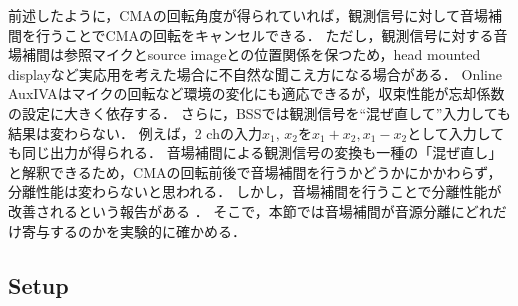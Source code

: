 \documentclass[sip,biber]{now-journal}
\begin{document}
前述したように，CMAの回転角度が得られていれば，観測信号に対して音場補間を行うことでCMAの回転をキャンセルできる．
ただし，観測信号に対する音場補間は参照マイクとsource imageとの位置関係を保つため，head mounted displayなど実応用を考えた場合に不自然な聞こえ方になる場合がある．
Online AuxIVAはマイクの回転など環境の変化にも適応できるが，収束性能が忘却係数の設定に大きく依存する．
さらに，BSSでは観測信号を``混ぜ直して''入力しても結果は変わらない．
例えば，2 chの入力$x_1,\, x_2$を$x_1+x_2, x_1-x_2$として入力しても同じ出力が得られる．
音場補間による観測信号の変換も一種の「混ぜ直し」と解釈できるため，CMAの回転前後で音場補間を行うかどうかにかかわらず，分離性能は変わらないと思われる．
しかし，音場補間を行うことで分離性能が改善されるという報告がある \cite{Nakashima:2022:ASJ:A}．
そこで，本節では音場補間が音源分離にどれだけ寄与するのかを実験的に確かめる．

\subsection*{Setup}
\end{document}

